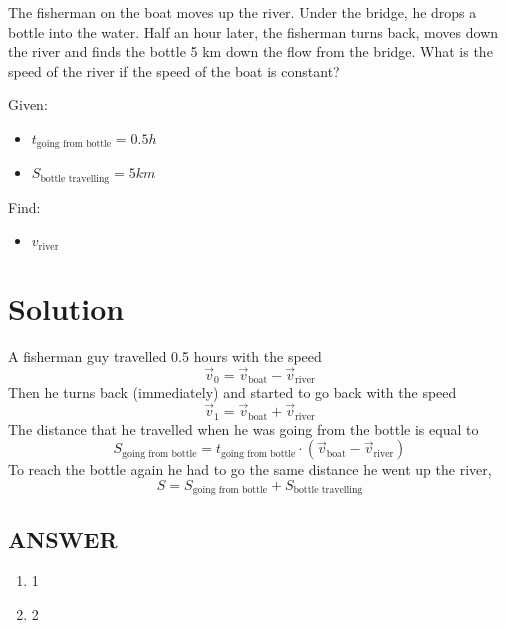 The fisherman on the boat moves up the river. Under the bridge, he drops a bottle into the water.
Half an hour later, the fisherman turns back, moves down the river and finds the bottle 5 km
down the flow from the bridge. What is the speed of the river if the speed of the boat is constant?

\bigbreak Given: \begin{itemize}
    \item $t_{\text{going from bottle}} = 0.5h$
    \item $S_{\text{bottle travelling}} = 5km$
\end{itemize}

Find: \begin{itemize}
    \item $v_{\text{river}}$
\end{itemize}

\section*{Solution}

A fisherman guy travelled 0.5 hours with the speed $$\Vec{v}_0 = \Vec{v}_{\text{boat}} - \Vec{v}_{\text{river}}$$
Then he turns back (immediately) and started to go back with the speed $$\Vec{v}_1 = \Vec{v}_{\text{boat}} + \Vec{v}_{\text{river}}$$
The distance that he travelled when he was going from the bottle is equal to $$S_{\text{going from bottle}} = t_{\text{going from bottle}} \cdot (\Vec{v}_{\text{boat}} - \Vec{v}_{\text{river}})$$
To reach the bottle again he had to go the same distance he went up the river,
$$S = S_{\text{going from bottle}} + S_{\text{bottle travelling}}$$


\vfill
\subsection*{ANSWER}
\begin{enumerate}
    \item 1
    \item 2
\end{enumerate}

